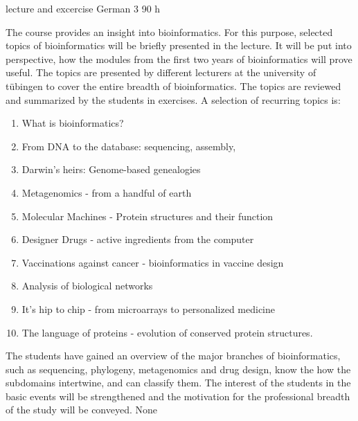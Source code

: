 {lecture and excercise}
{German}
{3}
{90 h}
{The course provides an insight into bioinformatics. For this purpose, selected topics of bioinformatics will be briefly presented in the lecture. It will be put into perspective, how the modules from the first two years of bioinformatics will prove useful. The topics are presented by different lecturers at the university of tübingen to cover the entire breadth of bioinformatics. The topics are reviewed and summarized by the students in exercises. A selection of recurring topics is: 
\begin{enumerate}
\item What is bioinformatics? 
\item From DNA to the database: sequencing, assembly, 
\item Darwin's heirs: Genome-based genealogies
\item Metagenomics - from a handful of earth
\item Molecular Machines - Protein structures and their function 
\item Designer Drugs - active ingredients from the computer
\item Vaccinations against cancer - bioinformatics in vaccine design 
\item Analysis of biological networks
\item It's hip to chip - from microarrays to personalized medicine
\item The language of proteins - evolution of conserved protein structures.
\end{enumerate}} 
{The students have gained an overview of the major branches of bioinformatics, such as sequencing, phylogeny, metagenomics and drug design, know the how the subdomains intertwine, and can classify them. The interest of the students in the basic events will be strengthened and the motivation for the professional breadth of the study will be conveyed.}
{None}